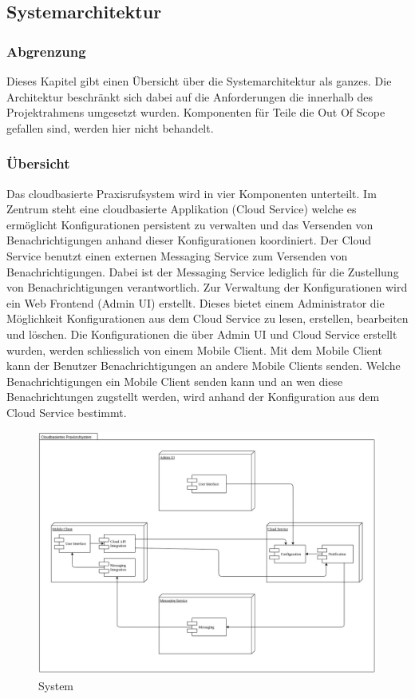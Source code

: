\subsection{Systemarchitektur}\label{subsec:systemarchitektur}
\subsubsection*{Abgrenzung}

Dieses Kapitel gibt einen Übersicht über die Systemarchitektur als ganzes. Die Architektur beschränkt sich dabei auf die
Anforderungen die innerhalb des Projektrahmens umgesetzt wurden. Komponenten für Teile die Out Of Scope gefallen sind,
werden hier nicht behandelt.

\subsubsection*{Übersicht}

Das cloudbasierte Praxisrufsystem wird in vier Komponenten unterteilt.
Im Zentrum steht eine cloudbasierte Applikation (Cloud Service) welche es ermöglicht Konfigurationen persistent zu verwalten und das Versenden von Benachrichtigungen anhand dieser Konfigurationen koordiniert.
Der Cloud Service benutzt einen externen Messaging Service zum Versenden von Benachrichtigungen. Dabei ist der Messaging Service lediglich für die Zustellung von Benachrichtigungen verantwortlich.
Zur Verwaltung der Konfigurationen wird ein Web Frontend (Admin UI) erstellt. Dieses bietet einem Administrator die Möglichkeit Konfigurationen aus dem Cloud Service zu lesen, erstellen, bearbeiten und löschen.
Die Konfigurationen die über Admin UI und Cloud Service erstellt wurden, werden schliesslich von einem Mobile Client. Mit dem Mobile Client kann der Benutzer Benachrichtigungen an andere Mobile Clients senden.
Welche Benachrichtigungen ein Mobile Client senden kann und an wen diese Benachrichtungen zugstellt werden, wird anhand der Konfiguration aus dem Cloud Service bestimmt.

\begin{figure}[h]
    \centering
    \begin{minipage}[b]{1.0\textwidth}
        \includegraphics[width=\textwidth]{graphics/Component_System}
        \caption{System}
    \end{minipage}
\end{figure}

